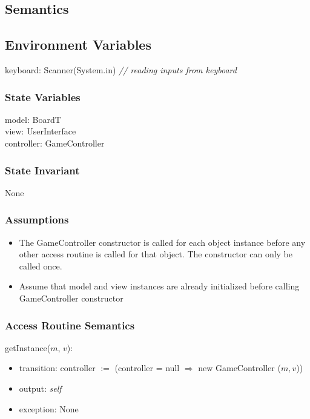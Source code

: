 \documentclass[12pt]{article}
\begin{document}
\subsection* {Semantics}

\subsection*{Environment Variables}

keyboard: Scanner(System.in) \qquad \textit{// reading inputs from keyboard}

\subsubsection* {State Variables}

model: BoardT \\
view: UserInterface \\
controller: GameController

\subsubsection* {State Invariant}

None

\subsubsection* {Assumptions}

\begin{itemize}
  \item The GameController constructor is called for each object instance before any
  other access routine is called for that object.  The constructor can only be
  called once.
  \item Assume that model and view instances are already initialized before calling GameController
        constructor
\end{itemize}

\subsubsection* {Access Routine Semantics}

getInstance($m$, $v$):
\begin{itemize}
  \item transition: controller $:=$ (controller = null $\Rightarrow$ new GameController ($m, v$))
  \item output: \textit{self}
  \item exception: None
\end{itemize}
\end{document}
